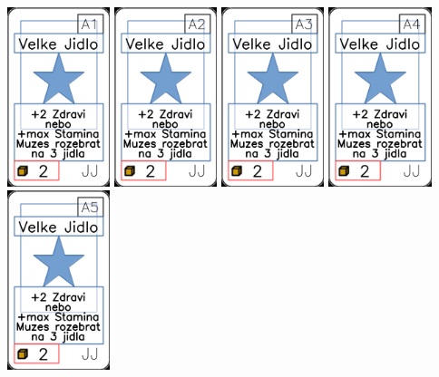 \documentclass[a4paper]{article}
\begin{document}
	\includegraphics[width=3.0cm]{img-1_30}
	\includegraphics[width=3.0cm]{img-1_31}
	\includegraphics[width=3.0cm]{img-1_32}
	\includegraphics[width=3.0cm]{img-1_33}
	\includegraphics[width=3.0cm]{img-1_34}
\end{document}
